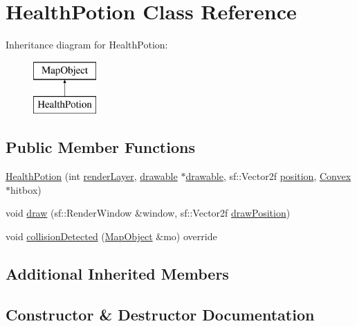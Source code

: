 \hypertarget{class_health_potion}{}\section{Health\+Potion Class Reference}
\label{class_health_potion}
Inheritance diagram for Health\+Potion\+:\begin{figure}[H]
\begin{center}
\leavevmode
\includegraphics[height=2.000000cm]{class_health_potion}
\end{center}
\end{figure}
\subsection*{Public Member Functions}
\begin{DoxyCompactItemize}
\item 
\hyperlink{class_health_potion_a604e26c9b397667ce5cd902867721d05}{Health\+Potion} (int \hyperlink{class_map_object_ac7431860a4ca955dc3db173926be3856}{render\+Layer}, \hyperlink{classdrawable}{drawable} $\ast$\hyperlink{classdrawable}{drawable}, sf\+::\+Vector2f \hyperlink{class_map_object_a00491cbf8e4cbc729ef37e11f3473860}{position}, \hyperlink{class_convex}{Convex} $\ast$hitbox)
\item 
void \hyperlink{class_health_potion_a75088ab30fb862023ae5667fabad660c}{draw} (sf\+::\+Render\+Window \&window, sf\+::\+Vector2f \hyperlink{class_map_object_a3f383fa967b67989a1d30f8f9ff73936}{draw\+Position})
\item 
void \hyperlink{class_health_potion_ac9f08cf54d715b5fe5cc71a9bf930fb7}{collision\+Detected} (\hyperlink{class_map_object}{Map\+Object} \&mo) override
\end{DoxyCompactItemize}
\subsection*{Additional Inherited Members}


\subsection{Constructor \& Destructor Documentation}
\hypertarget{class_health_potion_a604e26c9b397667ce5cd902867721d05}{}
